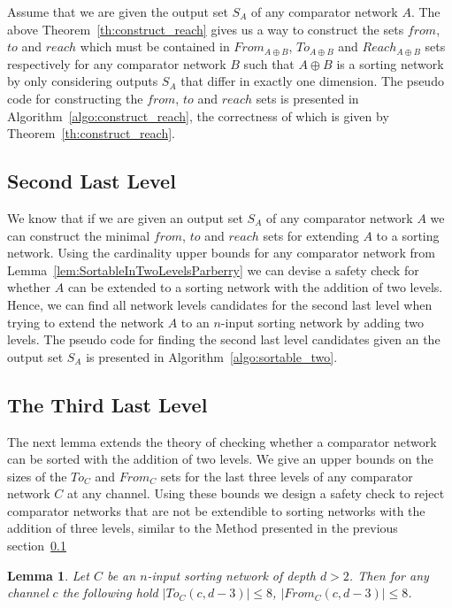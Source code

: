 \documentclass[13pt,a4paper]{article}
\newtheorem{lemma}[theorem]{Lemma}
\begin{document}
Assume that we are given the output set $S_A$ of any comparator network $A$. The above Theorem~\ref{th:construct_reach} gives us a way to construct the sets $from$, $to$ and $reach$ which must be contained in $From_{A \oplus B}$, $To_{A \oplus B}$ and $Reach_{A \oplus B}$ sets respectively for any comparator network $B$ such that $A \oplus B$ is a sorting network by only considering outputs $S_A$ that differ in exactly one dimension. The pseudo code for constructing the $from$, $to$ and $reach$ sets is presented in Algorithm~\ref{algo:construct_reach}, the correctness of which is given by Theorem~\ref{th:construct_reach}.



\subsection{Second Last Level}
\label{sec:sortable_two}

We know that if we are given an output set $S_A$ of any comparator network $A$ we can construct the minimal $from$, $to$ and $reach$ sets for extending $A$ to a sorting network. Using the cardinality upper bounds for any comparator network from Lemma~\ref{lem:SortableInTwoLevelsParberry} we can devise a safety check for whether $A$ can be extended to a sorting network with the addition of two levels. Hence, we can find all network levels candidates for the second last level when trying to extend the network $A$ to an $n$-input sorting network by adding two levels. The pseudo code for finding the second last level candidates given an the output set $S_A$ is presented in Algorithm~\ref{algo:sortable_two}.



\subsection{The Third Last Level}

The next lemma extends the theory of checking whether a comparator network can be sorted with the addition of two levels. We give an upper bounds on the sizes of the $To_C$ and $From_C$ sets for the last three levels of any comparator network $C$ at any channel. Using these bounds we design a safety check to reject comparator networks that are not be extendible to sorting networks with the addition of three levels, similar to the Method presented in the previous section~\ref{sec:sortable_two}

\begin{lemma}
\label{lem:reach_3}
Let $C$ be an $n$-input sorting network of depth $d > 2$. Then for any channel $c$ the following hold $\lvert To_C(c, d - 3) \lvert \leq 8$, $\lvert From_C(c, d - 3) \lvert \leq 8$.
\end{lemma}
\end{document}
